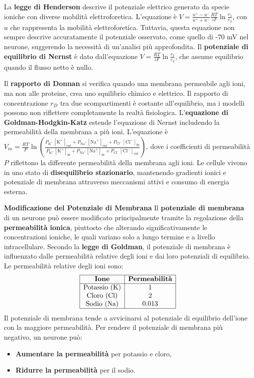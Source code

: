{La \textbf{legge di Henderson} descrive il potenziale elettrico generato da specie ioniche con diverse mobilità elettroforetica. L'equazione è $V = \frac{u^+-u^-}{u^++u^-}\frac{RT}{zF}\ln{\frac{c_1}{c_2}}$, con $u$ che rappresenta la mobilità elettroforetica. Tuttavia, questa equazione non sempre descrive accuratamente il potenziale osservato, come quello di -70 mV nel neurone, suggerendo la necessità di un'analisi più approfondita. Il \textbf{potenziale di equilibrio di Nernst} è dato dall'equazione $V = \frac{RT}{zF} \ln{\frac{c_1}{c_2}}$, che assume equilibrio quando il flusso netto è nullo.

Il \textbf{rapporto di Donnan} si verifica quando una membrana permeabile agli ioni, ma non alle proteine, crea uno squilibrio chimico e elettrico. Il rapporto di concentrazione $r_D$ tra due scompartimenti è costante all'equilibrio, ma i modelli possono non riflettere completamente la realtà fisiologica. L'\textbf{equazione di Goldman-Hodgkin-Katz} estende l'equazione di Nernst includendo la permeabilità della membrana a più ioni. L'equazione è $V_m = \frac{RT}{F} \ln \left( \frac{P_{\text{K}^+}[\text{K}^+]_\text{ext} + P_{\text{Na}^+}[\text{Na}^+]_\text{ext} + P_{\text{Cl}^-}[\text{Cl}^-]_\text{in}}{P_{\text{K}^+}[\text{K}^+]_\text{in} + P_{\text{Na}^+}[\text{Na}^+]_\text{in} + P_{\text{Cl}^-}[\text{Cl}^-]_\text{ext}} \right)$, dove i coefficienti di permeabilità $P$ riflettono la differente permeabilità della membrana agli ioni. Le cellule vivono in uno stato di \textbf{disequilibrio stazionario}, mantenendo gradienti ionici e potenziale di membrana attraverso meccanismi attivi e consumo di energia esterna.

\textbf{Modificazione del Potenziale di Membrana} Il \textbf{potenziale di membrana} di un neurone può essere modificato principalmente tramite la regolazione della \textbf{permeabilità ionica}, piuttosto che alterando significativamente le concentrazioni ioniche, le quali variano solo a lungo termine e a livello intracellulare.  Secondo la \textbf{legge di Goldman}, il potenziale di membrana è influenzato dalle permeabilità relative degli ioni e dai loro potenziali di equilibrio. Le permeabilità relative degli ioni sono:
\[
\begin{array}{|c|c|}
    \hline
    \textbf{Ione} & \textbf{Permeabilità} \\
    \hline
    \text{Potassio (K)} & 1 \\
    \text{Cloro (Cl)} & 2 \\
    \text{Sodio (Na)} & 0.013 \\
    \hline
\end{array}
\]
Il potenziale di membrana tende a avvicinarsi al potenziale di equilibrio dell'ione con la maggiore permeabilità. Per rendere il potenziale di membrana più negativo, un neurone può:
\begin{itemize}
    \item \textbf{Aumentare la permeabilità} per potassio e cloro,
    \item \textbf{Ridurre la permeabilità} per il sodio.
\end{itemize}

}
